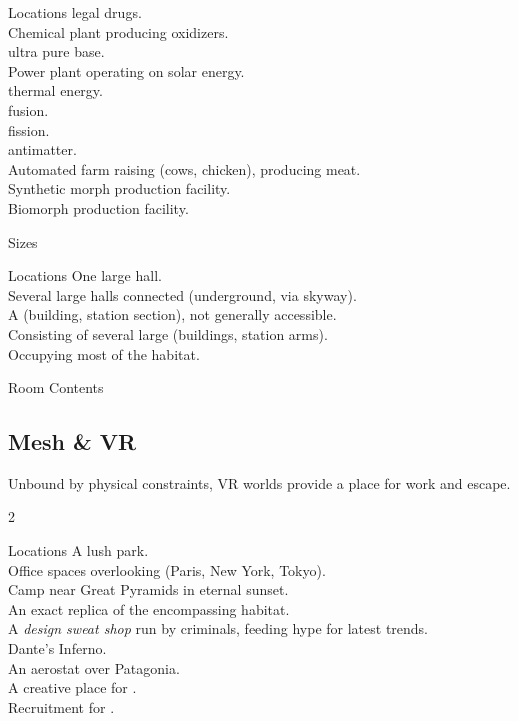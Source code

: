\documentclass[a4]{book}
\begin{document}
\begin{tableone}{Locations}
\textellipsis legal drugs.\\
Chemical plant producing oxidizers.\\
\textellipsis ultra pure  base.\\
Power plant operating on solar energy.\\
\textellipsis thermal energy.\\
\textellipsis fusion.\\
\textellipsis fission.\\
\textellipsis antimatter.\\
Automated farm raising (cows, chicken), producing meat.\\
Synthetic morph production facility.\\
Biomorph production facility.\\
\end{tableone}


Sizes

\begin{tableone}{Locations}
One large hall.\\
Several large halls connected (underground, via skyway).\\
A (building, station section), not generally accessible.\\
Consisting of several large (buildings, station arms).\\
Occupying most of the habitat.\\
\end{tableone}



Room Contents

\starttableone
\stoptableone


\begin{multicols}{2}

\subsection*{Mesh \& VR}

Unbound by physical constraints, VR worlds provide a place for work and escape.

\end{multicols}{2}

\begin{tableone}{Locations}
A lush park.\\
Office spaces overlooking (Paris, New York, Tokyo).\\
Camp near Great Pyramids in eternal sunset.\\
An exact replica of the encompassing habitat.\\
A \textit{design sweat shop} run by criminals, feeding hype for latest trends.\\
Dante's Inferno.\\
An aerostat over Patagonia.\\
A creative place for .\\
Recruitment for .\\
\end{tableone}
\end{document}

